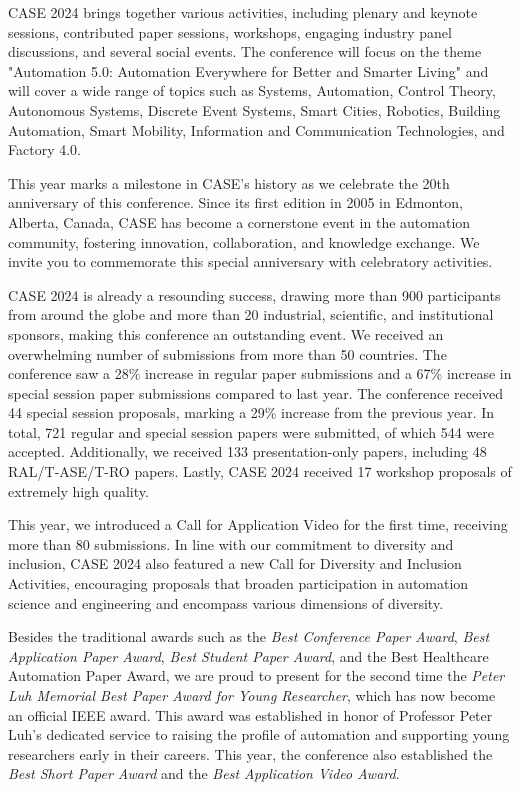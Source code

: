 \documentclass[
	openany, %
	parskip=full, %
	12pt, %
	a4paper, %
]{conferencebooklet} %
\begin{document}
CASE 2024 brings together various activities, including plenary and keynote sessions, contributed paper sessions, workshops, engaging industry panel discussions, and several social events. The conference will focus on the theme "Automation 5.0: Automation Everywhere for Better and Smarter Living" and will cover a wide range of topics such as Systems, Automation, Control Theory, Autonomous Systems, Discrete Event Systems, Smart Cities, Robotics, Building Automation, Smart Mobility, Information and Communication Technologies, and Factory 4.0.

This year marks a milestone in CASE's history as we celebrate the 20th anniversary of this conference. Since its first edition in 2005 in Edmonton, Alberta, Canada, CASE has become a cornerstone event in the automation community, fostering innovation, collaboration, and knowledge exchange. We invite you to commemorate this special anniversary with celebratory activities.

CASE 2024 is already a resounding success, drawing more than 900 participants from around the globe and more than 20 industrial, scientific, and institutional sponsors, making this conference an outstanding event. We received an overwhelming number of submissions from more than 50 countries. The conference saw a 28\% increase in regular paper submissions and a 67\% increase in special session paper submissions compared to last year. The conference received 44 special session proposals, marking a 29\% increase from the previous year. In total, 721 regular and special session papers were submitted, of which 544 were accepted. Additionally, we received 133 presentation-only papers, including 48 RAL/T-ASE/T-RO papers. Lastly, CASE 2024 received 17 workshop proposals of extremely high quality.

This year, we introduced a Call for Application Video for the first time, receiving more than 80 submissions. In line with our commitment to diversity and inclusion, CASE 2024 also featured a new Call for Diversity and Inclusion Activities, encouraging proposals that broaden participation in automation science and engineering and encompass various dimensions of diversity.

Besides the traditional awards such as the \textit{Best Conference Paper Award},\textit{ Best Application Paper Award}, \textit{Best Student Paper Award}, and the Best Healthcare Automation Paper Award, we are proud to present for the second time the \textit{Peter Luh Memorial Best Paper Award for Young Researcher}, which has now become an official IEEE award. This award was established in honor of Professor Peter Luh's dedicated service to raising the profile of automation and supporting young researchers early in their careers. This year, the conference also established the \textit{Best Short Paper Award} and the \textit{Best Application Video Award}.
\end{document}
